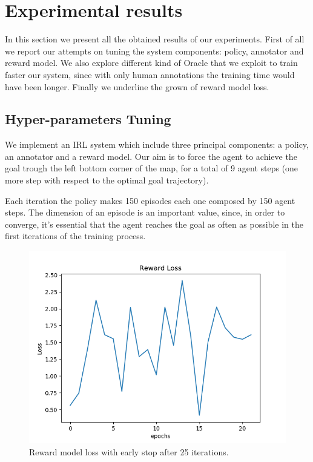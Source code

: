 







\section{Experimental results}\label{05}
In this section we present all the obtained results of our experiments. First of all we report our attempts on tuning the system components: policy, annotator and reward model. We also explore different kind of Oracle that we exploit to train faster our system, since with only human annotations the training time would have been longer. Finally we underline the grown of reward model loss.




\subsection{Hyper-parameters Tuning}        %
We implement an IRL system which include three principal components: a policy, an annotator and a reward model. Our aim is to force the agent to achieve the goal trough the left bottom corner of the map, for a total of 9 agent steps (one more step with respect to the optimal goal trajectory).

Each iteration the policy makes 150 episodes each one composed by 150 agent steps. The dimension of an episode is an important value, since, in order to converge, it's essential that the agent reaches the goal as often as possible in the first iterations of the training process. 


\begin{figure}[t]
    \centering
    \includegraphics[width=\linewidth]{data/reward_loss.png} 
    \caption{Reward model loss with early stop after 25 iterations.}
	\label{fig:rewardloss}%
\end{figure}

